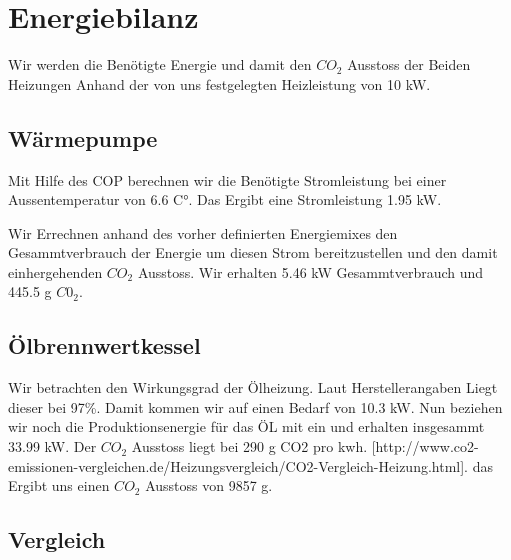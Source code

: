 \chapter{Energiebilanz}
\label{chap:bilanz}

Wir werden die Benötigte Energie und damit den $CO_2$ Ausstoss der Beiden
Heizungen Anhand der von uns festgelegten Heizleistung von 10 kW.

\section{Wärmepumpe}

Mit Hilfe des COP berechnen wir die Benötigte Stromleistung bei einer
Aussentemperatur von 6.6 C°.
Das Ergibt eine Stromleistung 1.95 kW.

Wir Errechnen anhand des vorher definierten Energiemixes den Gesammtverbrauch
der Energie um diesen Strom bereitzustellen und den damit einhergehenden $CO_2$
Ausstoss.
Wir erhalten 5.46 kW Gesammtverbrauch und 445.5 g $C0_2$.

\section{Ölbrennwertkessel}

Wir betrachten den Wirkungsgrad der Ölheizung.
Laut Herstellerangaben Liegt dieser bei 97\%.
Damit kommen wir auf einen Bedarf von 10.3 kW.
Nun beziehen wir noch die Produktionsenergie für das ÖL mit ein und erhalten
insgesammt 33.99 kW.
Der $CO_2$ Ausstoss liegt bei 290 g CO2 pro kwh.
[http://www.co2-emissionen-vergleichen.de/Heizungsvergleich/CO2-Vergleich-Heizung.html].
das Ergibt uns einen $CO_2$ Ausstoss von 9857 g.

\section{Vergleich}


